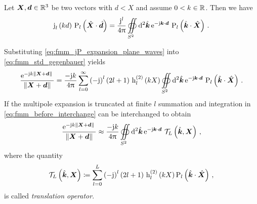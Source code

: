 \begin{lemma}
	Let $\pvec{X}, \pvec{d} \in \R^3$ be two vectors with
	$d < X$ and assume $0 < k \in \mathbb{R}$.
	Then we have \cite[410]{Stratton2007}
	\begin{equation}\label{eq:fmm_jP_expansion_plane_waves}
		\sphbesselj{l} \left( k d \right) \,
		\legendrepl{l} \left( \uv{X} \cdot \uv{d} \right) = 
		\frac{\im^l}{4\pi}	
		\ewaldintegral
		\exp{-\im \pvec{k} \cdot \pvec{d}}
		\legendrepl{l} \left( \uv{k} \cdot \uv{X} \right)
		\, .
	\end{equation}
\end{lemma}

Substituting \eqref{eq:fmm_jP_expansion_plane_waves} into
\eqref{eq:fmm_std_gegenbauer} yields
\begin{equation}\label{eq:fmm_before_interchange}
	\frac{\exp{-\im k \norm{\pvec{X} + \pvec{d}}}}{\norm{\pvec{X} + \pvec{d}}} = 
	\frac{-\im k}{4\pi}
	\sum\limits_{l=0}^{\infty}
	\left( -\im \right)^l
	\left( 2l + 1 \right) \,
	\sphbesselh{2}{l} \left( k X \right) 
	\ewaldintegral
	\exp{-\im \pvec{k} \cdot \pvec{d}}
	\legendrepl{l} \left( \uv{k} \cdot \uv{X} \right)
	\, .
\end{equation}
If the multipole expansion is truncated at finite $l$ summation and integration
in \eqref{eq:fmm_before_interchange} can be interchanged
\cite{Rokhlin1993,Coifman1993} to obtain
\begin{equation}\label{eq:fmm_std}
	\frac{\exp{-\im k \norm{\pvec{X} + \pvec{d}}}}{\norm{\pvec{X} + \pvec{d}}}
	\approx 
	\frac{-\im k}{4\pi}
	\ewaldintegral
	\exp{-\im \pvec{k} \cdot \pvec{d}} \,
	\mathcal{T}_L
	\left( \uv{k}, \pvec{X} \right)
	\, ,
\end{equation}
where the quantity
\begin{equation}
	\mathcal{T}_L
	\left( \uv{k}, \pvec{X} \right)
	\coloneqq
	\sum\limits_{l=0}^{L}
	\left( -\im \right)^l
	\left( 2l + 1 \right) \,
	\sphbesselh{2}{l} \left( k X \right) 
	\legendrepl{l} \left( \uv{k} \cdot \uv{X} \right)
	\, ,
\end{equation}
is called \emph{translation operator}.
